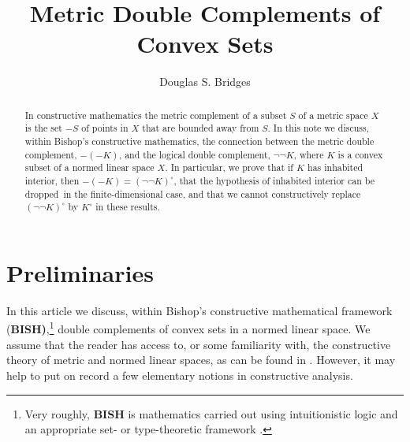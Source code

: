 \documentclass[11pt]{article}%
\begin{document}
\title{Metric Double Complements of Convex Sets}
\author{Douglas S. Bridges}
\maketitle

\begin{abstract}%
\noindent
In constructive mathematics the metric complement of a subset $S$ of a metric
space $X$ is the set $-S$ of points in $X$ that are bounded away from $S$. In
this note we discuss, within Bishop's constructive mathematics, the connection
between the metric double complement, $-(-K)$, and the logical double
complement, $\lnot\lnot K$, where $K$ is a convex subset of a normed linear
space $X$. In particular, we prove that if $K$ has inhabited interior, then
$-(-K)=\left(  \lnot\lnot K\right)  ^{\circ}$, that the hypothesis of
inhabited interior can be dropped\ in the finite-dimensional case, and that we
cannot constructively replace $(\lnot\lnot K)^{\circ}$ by $K^{\circ}$ in these results.

\end{abstract}%

\normalfont\sf


\section{Preliminaries}%

\noindent
In this article we discuss, within Bishop's constructive mathematical
framework (\textbf{BISH)},\footnote{%
\normalfont\sf
Very roughly, \textbf{BISH} is mathematics carried out using intuitionistic
logic and an appropriate set- or type-theoretic framework \cite{Handbook}.}
double complements of convex sets in a normed linear space. We assume that the
reader has access to, or some familiarity with, the constructive theory of
metric and normed linear spaces, as can be found in
\cite{Bishop,Handbook,BVtech}. However, it may help to put on record a few
elementary notions in constructive analysis.
\end{document}
